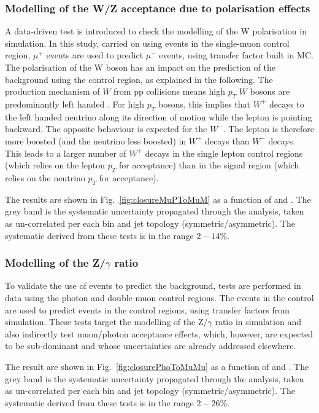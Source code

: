 \subsubsection*{Modelling of the W/Z acceptance due to polarisation effects}
\label{sec:tfSyst_Wpol}
A data-driven test is introduced to check the modelling of the W polarisation in simulation. 
In this study, carried on using events in the single-muon control region, $\mu^{+}$ events 
are used to predict $\mu^{-}$ events, using transfer factor built in MC. 
The polarisation of the W boson has an impact on the prediction 
of the \znunu background using the \mj control region, as explained in the following. 
The production mechanism of $W$ from pp
collisions means high $p_T$ $W$ bosons are predominantly left handed
\cite{WPol}.  For high $p_T$ bosons, this implies that $W^+$ decays to
the left handed neutrino along its direction of motion while the
lepton is pointing backward. The opposite behaviour is expected for
the $W^-$. The lepton is therefore more boosted (and the neutrino less
boosted) in $W^+$ decays than $W^-$ decays.  This leads to a larger
number of $W^+$ decays in the single lepton control regions (which
relies on the lepton $p_T$ for acceptance) than in the signal region
(which relies on the neutrino $p_T$ for acceptance).

The results are shown in Fig.~\ref{fig:closureMuPToMuM} as a function of \scalht and \njet. 
The grey band is the systematic uncertainty propagated through the analysis, 
taken as un-correlated per each \scalht bin and jet topology (symmetric/asymmetric). The systematic derived from these tests is
in the range $2-14\%$.

\subsubsection*{Modelling of the Z/$\gamma$ ratio}
\label{sec:tfSyst_ZGratio}
To validate the use of \gj events to predict the \znunu
background, tests are performed in data using the photon and double-muon control regions. 
The events in the \gj control are used to predict events in the \mmj control regions, 
using transfer factors from simulation. 
These tests target the modelling of the Z/$\gamma$ ratio in simulation and 
also indirectly test muon/photon acceptance effects, which, however, 
are expected to be sub-dominant and whose uncertainties are already addressed elsewhere. 

The result are shown in Fig.~\ref{fig:closurePhoToMuMu} as a function of \scalht and \njet. 
The grey band is the systematic uncertainty propagated through the analysis, 
taken as un-correlated per each \scalht bin and jet topology (symmetric/asymmetric). The systematic derived from these tests is
in the range $2-26\%$.

